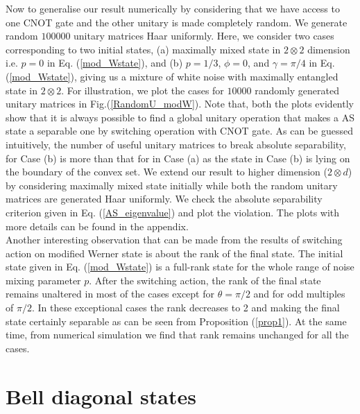 Now to generalise our result numerically by considering that we have access to one CNOT gate and the other unitary is made completely random. We generate random $100000$ unitary matrices Haar uniformly. Here, we consider two cases corresponding to two initial states, (a) maximally mixed state in $2\otimes2$ dimension i.e. $p=0$ in Eq. (\ref{mod_Wstate}), and (b) $p=1/3$, $\phi=0$, and $\gamma=\pi/4$ in Eq. (\ref{mod_Wstate}), giving us a mixture of white noise with maximally entangled state in $2\otimes2$. For illustration, we plot the cases for $10000$ randomly generated unitary matrices in Fig.(\ref{RandomU_modW}). Note that, both the plots evidently show that it is always possible to find a global unitary operation that makes a AS state a separable one by switching operation with CNOT gate. As can be guessed intuitively, the number of useful unitary matrices to break absolute separability, for Case (b) is more than that for in Case (a) as the state in Case (b) is lying on the boundary of the convex set. We extend our result to higher dimension ($2\otimes d$) by considering maximally mixed state initially while both the random unitary matrices are generated Haar uniformly. We check the absolute separability criterion given in Eq. (\ref{AS_eigenvalue}) and plot the violation. The plots with more details can be found in the appendix.\\
Another interesting observation that can be made from the results of switching action on modified Werner state is about the rank of the final state. The initial state given in Eq. (\ref{mod_Wstate}) is a full-rank state for the whole range of noise mixing parameter $p$. After the switching action, the rank of the final state remains unaltered in most of the cases except for $\theta=\pi/2$ and for odd multiples of $\pi/2$. In these exceptional cases the rank decreases to 2 and making the final state certainly separable as can be seen from Proposition (\ref{prop1}). At the same time, from numerical simulation we find that rank remains unchanged for all the cases. 

\section{Bell diagonal states}

